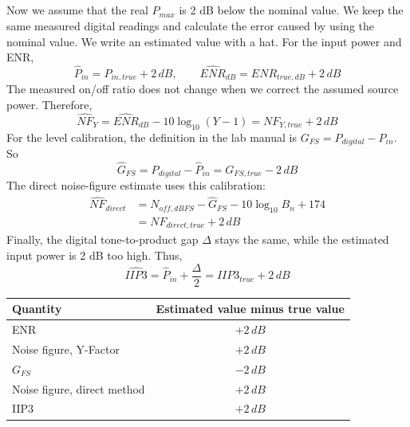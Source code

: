 \documentclass[]{article}
\begin{document}
    \subsection{}
    Now we assume that the real $P_{max}$ is 2 dB below the nominal value. We keep the same measured digital readings and calculate the error caused by using the nominal value. We write an estimated value with a hat. For the input power and ENR,
    \begin{equation*}
        \widehat P_{in}=P_{in,true}+2\,dB,\qquad
        \widehat{ENR}_{dB}=ENR_{true,dB}+2\,dB
    \end{equation*}
    The measured on/off ratio does not change when we correct the assumed source power. Therefore,
    \begin{equation*}
        \widehat{NF}_Y=\widehat{ENR}_{dB}-10\log_{10}(Y-1)
                        =NF_{Y,true}+2\,dB
    \end{equation*}
    For the level calibration, the definition in the lab manual is $G_{FS}=P_{digital}-P_{in}$. So
    \begin{equation*}
        \widehat G_{FS}=P_{digital}-\widehat P_{in}=G_{FS,true}-2\,dB
    \end{equation*}
    The direct noise-figure estimate uses this calibration:
    \begin{equation*}
        \begin{split}
        \widehat{NF}_{direct}
        &=N_{off,dBFS}-\widehat G_{FS}-10\log_{10}B_n+174\\
        &=NF_{direct,true}+2\,dB
        \end{split}
    \end{equation*}
    Finally, the digital tone-to-product gap $\Delta$ stays the same, while the estimated input power is 2 dB too high. Thus,
    \begin{equation*}
        \widehat{IIP3}=\widehat P_{in}+\frac{\Delta}{2}=IIP3_{true}+2\,dB
    \end{equation*}

    \begin{table}[H]
    \centering
    \renewcommand{\arraystretch}{1.3}
    \begin{tabular}{|l|c|}
    \hline
    Quantity & Estimated value minus true value \\ \hline
    ENR & $+2\,dB$ \\ \hline
    Noise figure, Y-Factor & $+2\,dB$ \\ \hline
    $G_{FS}$ & $-2\,dB$ \\ \hline
    Noise figure, direct method & $+2\,dB$ \\ \hline
    IIP3 & $+2\,dB$ \\ \hline
    \end{tabular}
    \end{table}
\end{document}
